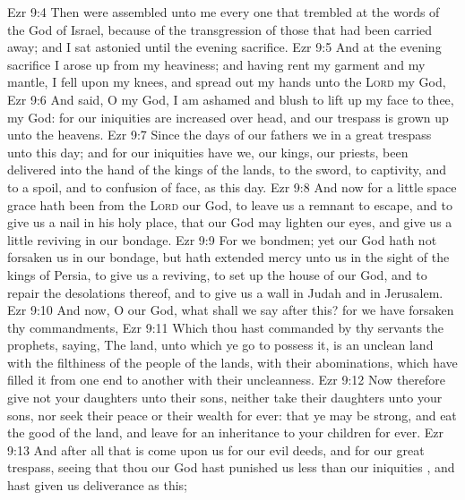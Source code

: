 \vs Ezr 9:4 Then were assembled unto me every one that trembled at the words of the God of Israel, because of the transgression of those that had been carried away; and I sat astonied until the evening sacrifice.
\vs Ezr 9:5 And at the evening sacrifice I arose up from my heaviness; and having rent my garment and my mantle, I fell upon my knees, and spread out my hands unto the \textsc{Lord} my God,
\vs Ezr 9:6 And said, O my God, I am ashamed and blush to lift up my face to thee, my God: for our iniquities are increased over  head, and our trespass is grown up unto the heavens.
\vs Ezr 9:7 Since the days of our fathers  we  in a great trespass unto this day; and for our iniquities have we, our kings,  our priests, been delivered into the hand of the kings of the lands, to the sword, to captivity, and to a spoil, and to confusion of face, as  this day.
\vs Ezr 9:8 And now for a little space grace hath been  from the \textsc{Lord} our God, to leave us a remnant to escape, and to give us a nail in his holy place, that our God may lighten our eyes, and give us a little reviving in our bondage.
\vs Ezr 9:9 For we  bondmen; yet our God hath not forsaken us in our bondage, but hath extended mercy unto us in the sight of the kings of Persia, to give us a reviving, to set up the house of our God, and to repair the desolations thereof, and to give us a wall in Judah and in Jerusalem.
\vs Ezr 9:10 And now, O our God, what shall we say after this? for we have forsaken thy commandments,
\vs Ezr 9:11 Which thou hast commanded by thy servants the prophets, saying, The land, unto which ye go to possess it, is an unclean land with the filthiness of the people of the lands, with their abominations, which have filled it from one end to another with their uncleanness.
\vs Ezr 9:12 Now therefore give not your daughters unto their sons, neither take their daughters unto your sons, nor seek their peace or their wealth for ever: that ye may be strong, and eat the good of the land, and leave  for an inheritance to your children for ever.
\vs Ezr 9:13 And after all that is come upon us for our evil deeds, and for our great trespass, seeing that thou our God hast punished us less than our iniquities , and hast given us  deliverance as this;
